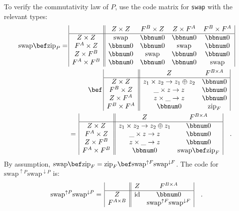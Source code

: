 To verify the commutativity law of $P$, use the code matrix for \lstinline!swap!
with the relevant types:
\begin{align*}
\text{swap}\bef\text{zip}_{P}= & \,\begin{array}{|c||cccc|}
 & Z\times Z & F^{B}\times Z & Z\times F^{A} & F^{B}\times F^{A}\\
\hline Z\times Z & \text{swap} & \bbnum 0 & \bbnum 0 & \bbnum 0\\
F^{A}\times Z & \bbnum 0 & \bbnum 0 & \text{swap} & \bbnum 0\\
Z\times F^{B} & \bbnum 0 & \text{swap} & \bbnum 0 & \bbnum 0\\
F^{A}\times F^{B} & \bbnum 0 & \bbnum 0 & \bbnum 0 & \text{swap}
\end{array}\\
 & \quad\quad\quad\bef\,\begin{array}{|c||cc|}
 & Z & F^{B\times A}\\
\hline Z\times Z & z_{1}\times z_{2}\rightarrow z_{1}\oplus z_{2} & \bbnum 0\\
F^{B}\times Z & \_\times z\rightarrow z & \bbnum 0\\
Z\times F^{A} & z\times\_\rightarrow z & \bbnum 0\\
F^{B}\times F^{A} & \bbnum 0 & \text{zip}_{F}
\end{array}\\
 & \,=\,\begin{array}{|c||cc|}
 & Z & F^{B\times A}\\
\hline Z\times Z & z_{1}\times z_{2}\rightarrow z_{2}\oplus z_{1} & \bbnum 0\\
F^{A}\times Z & \_\times z\rightarrow z & \bbnum 0\\
Z\times F^{B} & z\times\_\rightarrow z & \bbnum 0\\
F^{A}\times F^{B} & \bbnum 0 & \text{swap}\bef\text{zip}_{F}
\end{array}\quad.
\end{align*}
By assumption, $\text{swap}\bef\text{zip}_{F}=\text{zip}_{F}\bef\text{swap}^{\uparrow F}\text{swap}^{\downarrow F}$.
The code for $\text{swap}^{\uparrow P}\text{swap}^{\downarrow P}$
is:
\[
\text{swap}^{\uparrow P}\text{swap}^{\downarrow P}=\,\begin{array}{|c||cc|}
 & Z & F^{B\times A}\\
\hline Z & \text{id} & \bbnum 0\\
F^{A\times B} &  & \text{swap}^{\uparrow F}\text{swap}^{\downarrow F}
\end{array}\quad.
\]
